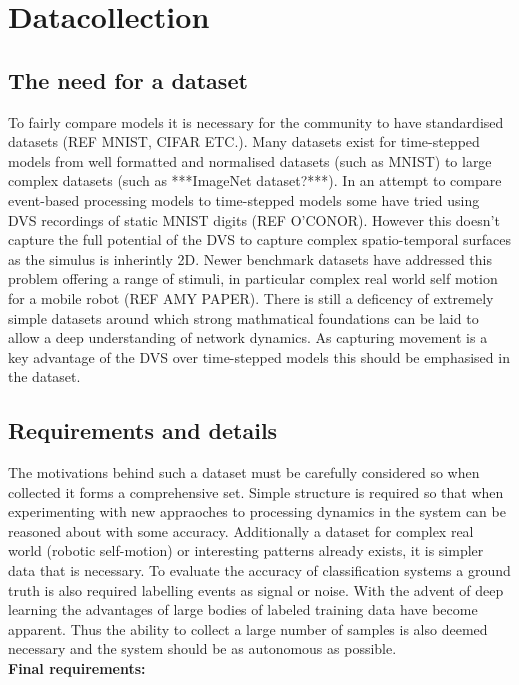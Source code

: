 \chapter{Datacollection}

\section{The need for a dataset}
To fairly compare models it is necessary for the community to have standardised datasets (REF MNIST, CIFAR ETC.). %
Many datasets exist for time-stepped models from well formatted and normalised datasets (such as MNIST) to large complex datasets (such as ***ImageNet dataset?***).
In an attempt to compare event-based processing models to time-stepped models some have tried using DVS recordings of static MNIST digits (REF O'CONOR). %
However this doesn't capture the full potential of the DVS to capture complex spatio-temporal surfaces as the simulus is inherintly 2D.
Newer benchmark datasets have addressed this problem offering a range of stimuli, in particular complex real world self motion for a mobile robot (REF AMY PAPER). %
There is still a deficency of extremely simple datasets around which strong mathmatical foundations can be laid to allow a deep understanding of network dynamics. 
As capturing movement is a key advantage of the DVS over time-stepped models this should be emphasised in the dataset. 

\section{Requirements and details}
The motivations behind such a dataset must be carefully considered so when collected it forms a comprehensive set.
Simple structure is required so that when experimenting with new appraoches to processing dynamics in the system can be reasoned about with some accuracy.
Additionally a dataset for complex real world (robotic self-motion) or interesting patterns already exists, it is simpler data that is necessary.
To evaluate the accuracy of classification systems a ground truth is also required labelling events as signal or noise. 
With the advent of deep learning the advantages of large bodies of labeled training data have become apparent. 
Thus the ability to collect a large number of samples is also deemed necessary and the system should be as autonomous as possible. \\ 
\textbf{Final requirements:}

